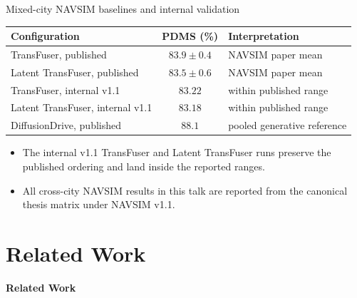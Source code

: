 \documentclass[aspectratio=169, xcolor={table}]{beamer}
\newcommand{\sectiondivider}[1]{%
  \begin{frame}[plain]
    \centering
    \vfill
    {\LARGE \textbf{#1}\par}
    \vfill
  \end{frame}
}
\begin{document}
\begin{frame}{Mixed-city NAVSIM baselines and internal validation}
  \centering\small
  \begin{tabular}{@{}l c l@{}}
    \toprule
    \textbf{Configuration} & \textbf{PDMS (\%)} & \textbf{Interpretation} \\
    \midrule
    TransFuser, published & $83.9\pm0.4$ & NAVSIM paper mean \\
    Latent TransFuser, published & $83.5\pm0.6$ & NAVSIM paper mean \\
    TransFuser, internal v1.1 & $83.22$ & within published range \\
    Latent TransFuser, internal v1.1 & $83.18$ & within published range \\
    DiffusionDrive, published & $88.1$ & pooled generative reference \\
    \bottomrule
  \end{tabular}
  \vspace{8pt}
  \begin{itemize}\footnotesize
    \item The internal v1.1 TransFuser and Latent TransFuser runs preserve the published ordering and land inside the reported ranges.
    \item All cross-city NAVSIM results in this talk are reported from the canonical thesis matrix under NAVSIM v1.1.
  \end{itemize}
\end{frame}

\section{Related Work}

\sectiondivider{Related Work}
\end{document}
